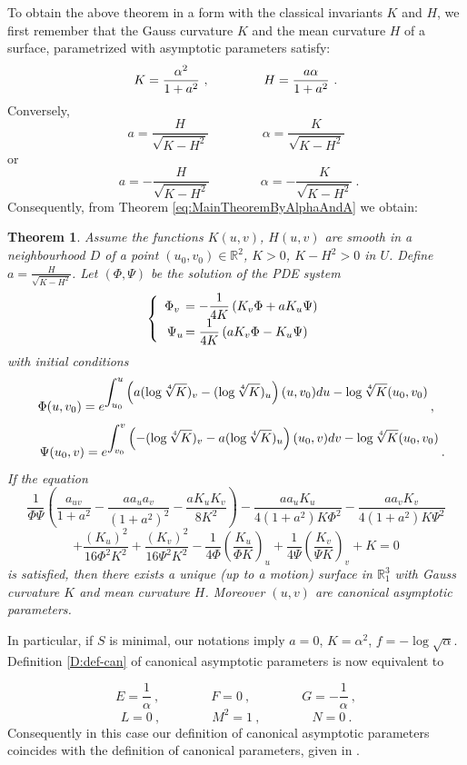 \documentclass[12pt]{amsart}
\newtheorem{thm}{Theorem}[section]
\theoremstyle{definition}
\theoremstyle{remark}
\newcommand{\ds}{\displaystyle}
\begin{document}
To obtain the above theorem in a form with the classical invariants $K$ and $H$, we first remember that
the Gauss curvature $K$ and the mean curvature $H$ of a surface, parametrized with asymptotic
parameters satisfy:
$$
	K=\frac{\alpha^2}{1+a^2} \ ,  \hspace{1.5cm}
	H=\frac{a\alpha}{1+a^2} \ . 
$$
Conversely, 
$$
	a=\frac{H}{\sqrt{K-H^2}}  \qquad\qquad\  \alpha =\frac{K}{\sqrt{K-H^2}}
$$
or
$$
	\ \ a=-\frac{H}{\sqrt{K-H^2}}  \qquad\qquad \alpha =-\frac{K}{\sqrt{K-H^2}} \ .
$$
Consequently,  from Theorem \ref{eq:MainTheoremByAlphaAndA} we obtain:


\begin{thm} \label{eq:MainTheoremByKandH}
Assume the functions $K(u,v)$, $H(u,v)$ are smooth in a neighbourhood 
$ D $ of a point $(u_0,v_0) \in \mathbb R^2$, $K>0$, $K-H^2>0$ in $U$. 
Define  $a=\frac{H}{\sqrt{K-H^2}}$.
Let $(\Phi,\Psi)$ be the solution of the  PDE system
$$
	\left\{\begin{array}{rl}
	 \Phi_v \hspace{-0.2cm}    &  \ds =-\frac1{4K}\left( K_v\Phi +aK_u\Psi \right)  \\
	 \Psi_u  \hspace{-0.3cm} &  \ds =\frac{1}{4K}\left( aK_v\Phi -K_u\Psi \right)
	\end{array}\right.
$$
with initial conditions 
$$
	\Phi(u,v_0)=e^{\ds\int_{u_0}^u\left(a(\log\root4\of K)_v-(\log\root4\of K)_u\right)(u,v_0)du -\log\root4\of K(u_0,v_0)} \,,
$$
$$
	\quad  \Psi(u_0,v)=e^{\ds\int_{v_0}^v\left(-(\log\root4\of K)_v-a(\log\root4\of K)_u\right)(u_0,v)dv -\log\root4\of K(u_0,v_0)} \,.
$$
If the equation
$$
	 \frac1{\Phi\Psi}\left(\frac{a_{uv}}{1+a^2}-\frac{aa_ua_v}{(1+a^2)^2} -\frac{aK_uK_v}{8K^2} \right)
	   - \frac{  aa_uK_u}{4(1+a^2)K\Phi^2}	   -\frac{  aa_vK_v}{4(1+a^2)K\Psi^2}
$$
$$
	+ \frac{(K_u)^2}{16\Phi^2K^2}+\frac{(K_v)^2}{16\Psi^2K^2} 
	- \frac1{4\Phi}\left(\frac{K_u}{\Phi K}\right)_u +\frac1{4\Psi}\left(\frac{K_v}{\Psi K}\right)_v 
	 +K=0  
$$
is satisfied, then there exists a unique (up to a motion) surface in $\mathbb R^3_1$ with 
Gauss curvature $K$ and mean curvature $H$.
Moreover $(u,v)$ are canonical asymptotic parameters.

\end{thm}


In particular, if $S$ is minimal, our notations imply $a=0$, $K=\alpha^2$,
$f=-\log\sqrt\alpha$.
Definition \ref{D:def-can} of canonical asymptotic parameters is now equivalent to

$$
		 E=\frac{1}{\alpha} \ ,  \qquad\qquad  F=0 \ ,  \qquad\qquad
		 G=-\frac{1}{\alpha}  \ ,
$$
$$
		 L=0 \ ,  \qquad\qquad  M^2=1 \ ,  \qquad\qquad
		 N=0  \ .
$$
Consequently in this case our definition 
of canonical asymptotic parameters coincides with the definition of canonical parameters, given in \cite{Ganchev-Krassi-2019}.
\end{document}
